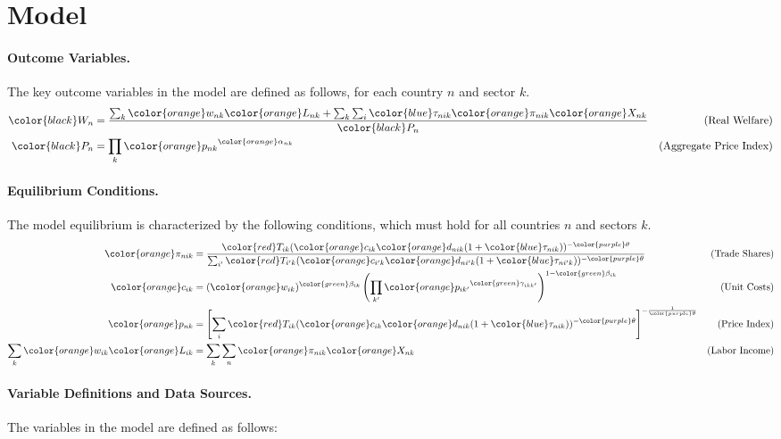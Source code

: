 \section{Model}
\paragraph{Outcome Variables.} The key outcome variables in the model are defined as follows, for each country $n$ and sector $k$.
\begin{align*}
    {\color{black}W_n} &= \frac{\sum_{k} {\color{orange}w_{nk}} {\color{orange}L_{nk}} + \sum_{k} \sum_{i} {\color{blue}\tau_{nik}} {\color{orange}\pi_{nik}} {\color{orange}X_{nk}}}{{\color{black}P_n}} & \text{(Real Welfare)} \\
    {\color{black}P_n} &= \prod_{k} {\color{orange}p_{nk}}^{{\color{orange}\alpha_{nk}}} & \text{(Aggregate Price Index)}
\end{align*}

\paragraph{Equilibrium Conditions.} The model equilibrium is characterized by the following conditions, which must hold for all countries $n$ and sectors $k$.
\begin{align*}
    {\color{orange}\pi_{nik}} &= \frac{{\color{red}T_{ik}} ({\color{orange}c_{ik}} {\color{orange}d_{nik}} (1 + {\color{blue}\tau_{nik}}))^{-{\color{purple}\theta}}}{\sum_{i'} {\color{red}T_{i'k}} ({\color{orange}c_{i'k}} {\color{orange}d_{ni'k}} (1 + {\color{blue}\tau_{ni'k}}))^{-{\color{purple}\theta}}} & \text{(Trade Shares)} \\
    {\color{orange}c_{ik}} &= ({\color{orange}w_{ik}})^{{\color{green}\beta_{ik}}} \left(\prod_{k'} {\color{orange}p_{ik'}}^{{\color{green}\gamma_{ikk'}}}\right)^{1 - {\color{green}\beta_{ik}}} & \text{(Unit Costs)} \\
    {\color{orange}p_{nk}} &= \left[ \sum_{i} {\color{red}T_{ik}} ({\color{orange}c_{ik}} {\color{orange}d_{nik}} (1 + {\color{blue}\tau_{nik}}))^{-{\color{purple}\theta}} \right]^{-\frac{1}{{\color{purple}\theta}}} & \text{(Price Index)} \\
   \sum_{k} {\color{orange}w_{ik}} {\color{orange}L_{ik}} &= \sum_{k} \sum_{n} {\color{orange}\pi_{nik}} {\color{orange}X_{nk}} & \text{(Labor Income)}
\end{align*}
\newpage
\paragraph{Variable Definitions and Data Sources.} The variables in the model are defined as follows:
